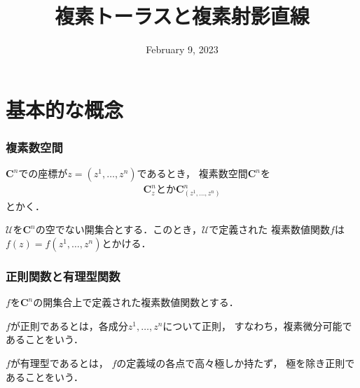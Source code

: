 \documentclass[dvipdfmx,12pt,aspectratio=169]{beamer}%
\newcommand{\cc}{\mathbf{C}}
\newcommand{\mcal}{\mathcal}
\newcommand{\UU}{\mcal{U}}
\begin{document}
    
\title{複素トーラスと複素射影直線}
\date{February 9, 2023}




\begin{frame}
    \titlepage
\end{frame}

\section{基本的な概念}

\begin{frame}
    \frametitle{複素数空間}

    $\cc^{n}$での座標が$z=(z^{1},\dots,z^{n})$であるとき，
複素数空間$\cc^{n}$を
\begin{align*}
    \cc^{n}_{z} \text{とか} \cc^{n}_{(z^{1},\dots,z^{n})}
\end{align*}
とかく．

$\UU$を$\cc^n$の空でない開集合とする．このとき，$\UU$で定義された
複素数値関数$f$は$f(z)=f(z^{1},\dots,z^{n})$とかける．
\end{frame}

\begin{frame}
    \frametitle{正則関数と有理型関数}

    $f$を$\cc^n$の開集合上で定義された複素数値関数とする．

    \begin{Definition}[正則関数]
        $f$が正則であるとは，各成分$z^1,\ldots,z^n$について正則，
        すなわち，複素微分可能であることをいう．
    \end{Definition}

    \begin{Definition}[有理型関数]
        $f$が有理型であるとは，
        $f$の定義域の各点で高々極しか持たず，
        極を除き正則であることをいう．
    \end{Definition}

\end{frame}
\end{document}
